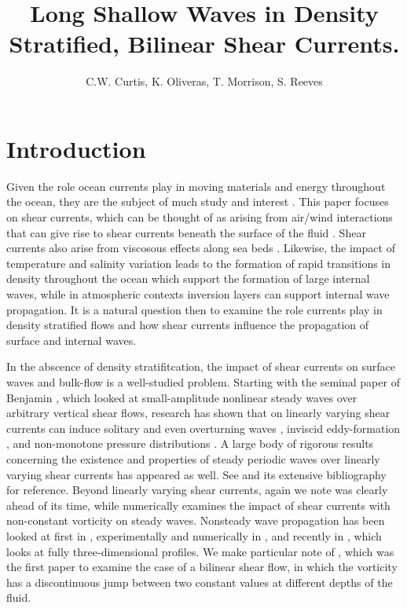 \documentclass[a4paper,11pt]{article}
\title{Long Shallow Waves in Density Stratified, Bilinear Shear Currents.}
\author{C.W. Curtis, K. Oliveras, T. Morrison, S. Reeves}
\date{}
\begin{document}
\maketitle
\section{Introduction}
Given the role ocean currents play in moving materials and energy throughout the ocean, they are the subject of much study and interest \cite{young1}.  This paper focuses on shear currents, which can be thought of as arising from air/wind interactions \cite{miles,valenzuela,young2} that can give rise to shear currents beneath the surface of the fluid \cite{banner,dasilva}.  Shear currents also arise from viscosous effects along sea beds \cite{dasilva}. Likewise, the impact of temperature and salinity variation leads to the formation of rapid transitions in density throughout the ocean which support the formation of large internal waves, while in atmospheric contexts inversion layers can support internal wave propagation.  It is a natural question then to examine the role currents play in density stratified flows and how shear currents influence the propagation of surface and internal waves.  

In the abscence of density stratifitcation, the impact of shear currents on surface waves and bulk-flow is a well-studied problem.  Starting with the seminal paper of Benjamin \cite{benjamin}, which looked at small-amplitude nonlinear steady waves over arbitrary vertical shear flows, research has shown that on linearly varying shear currents can induce solitary and even overturning waves \cite{dasilva,choi,freeman,simmen,vandenbroeck}, inviscid eddy-formation \cite{dasilva,miroshnikov}, and non-monotone pressure distributions \cite{dasilva,ali,oliveras}.  A large body of rigorous results concerning the existence and properties of steady periodic waves over linearly varying shear currents has appeared as well.  See \cite{constantin} and its extensive bibliography for reference.  Beyond linearly varying shear currents, again we note \cite{benjamin} was clearly ahead of its time, while \cite{ko} numerically examines the impact of shear currents with non-constant vorticity on steady waves.  Nonsteady wave propagation has been looked at first in \cite{dalrymple}, experimentally and numerically in \cite{swan}, and recently in \cite{nwogu}, which looks at fully three-dimensional profiles.  We make particular note of \cite{dalrymple}, which was the first paper to examine the case of a bilinear shear flow, in which the vorticity has a discontinuous jump between two constant values at different depths of the fluid.  
\end{document}
